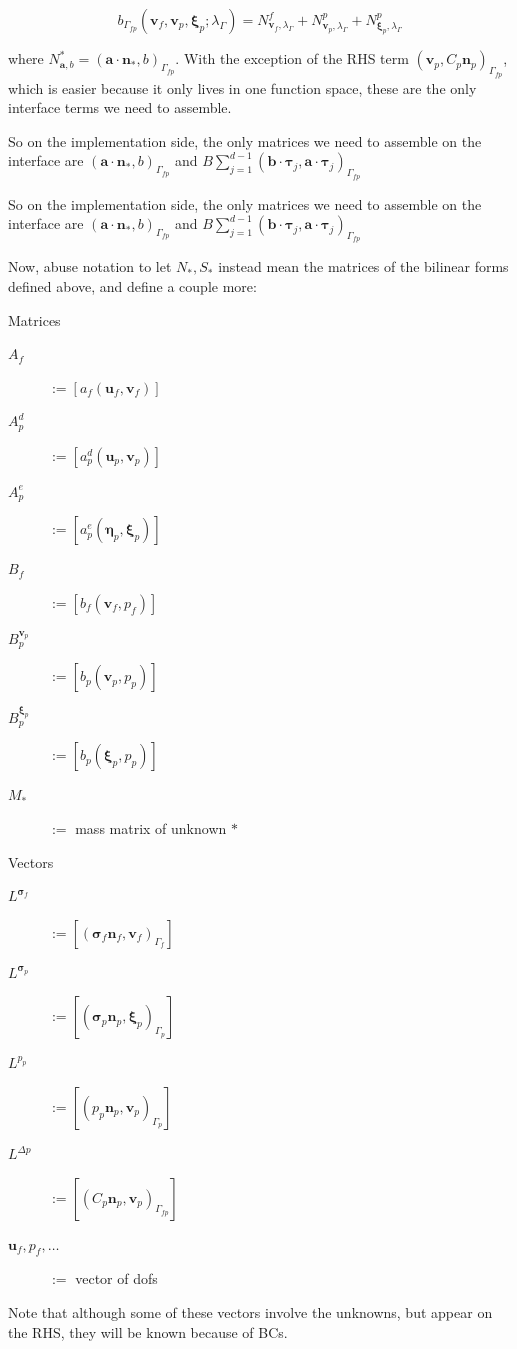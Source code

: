 \documentclass{article}
\newcommand{\mathspace}[1]{\ensuremath{#1}\xspace} %
\newcommand{\sigmabf}{\mathspace{\boldsymbol{\sigma}}}
\newcommand{\inner}[2]{\mathspace{\left (#1, #2 \right)}}
\newcommand{\defeq}{\mathspace{:=}}
\newcommand{\matrixform}[1]{\mathspace{\left [ #1 \right ]}}
\newcommand{\taubf}{\mathspace{\boldsymbol{\tau}}}
\newcommand{\stokesbdy}{\mathspace{\Gamma_{f}}}
\newcommand{\darcybdy}{\mathspace{\Gamma_{p}}}
\newcommand{\interface}{\mathspace{\Gamma_{fp}}}
\newcommand{\nf}{\mathspace{\mathbf{n}_f}}
\newcommand{\np}{\mathspace{\mathbf{n}_p}}
\newcommand{\nporf}{\mathspace{\mathbf{n}_*}}
\newcommand{\uf}{\mathspace{\mathbf{u}_f}}
\newcommand{\vf}{\mathspace{\mathbf{v}_f}}
\newcommand{\up}{\mathspace{\mathbf{u}_p}}
\newcommand{\vp}{\mathspace{\mathbf{v}_p}}
\newcommand{\pf}{\mathspace{p_f}}
\newcommand{\pp}{\mathspace{p_p}}
\newcommand{\disp}{\mathspace{\boldsymbol{\eta}_p}}
\newcommand{\disptest}{\mathspace{\boldsymbol{\xi}_p}}
\newcommand{\mult}{\mathspace{\lambda_{\Gamma}}}
\begin{document}
$$b_{\interface}(\vf, \vp, \disptest; \mult) = N^f_{\vf, \mult} + N^p_{\vp, \mult} + N^p_{\disptest, \mult} $$

where $N^*_{\mathbf{a}, b} = \inner{\mathbf{a} \cdot \nporf}{b}_{\interface}$. With the exception of the RHS term $\inner{\vp}{C_p\np}_{\interface}$, which is easier because it only lives in one function space, these are the only interface terms we need to assemble.

So on the implementation side, the only matrices we need to assemble on the interface are $\inner{\mathbf{a} \cdot \nporf}{b}_{\interface}$ and  $B \sum_{j=1}^{d-1} \inner{\mathbf{b} \cdot \taubf_j}{\mathbf{a} \cdot \taubf_j}_{\interface}$

So on the implementation side, the only matrices we need to assemble on the interface are $\inner{\mathbf{a} \cdot \nporf}{b}_{\interface}$ and  $B \sum_{j=1}^{d-1} \inner{\mathbf{b} \cdot \taubf_j}{\mathbf{a} \cdot \taubf_j}_{\interface}$

Now, abuse notation to let $N_*, S_*$ instead mean the matrices of the bilinear forms defined above, and define a couple more:
\begin{center}
  \begin{multicols}{2}
    Matrices
\begin{description}
\item[$A_f$] \defeq \matrixform{a_f(\uf, \vf)}
\item[$A^d_p$]\defeq  \matrixform{a_p^d(\up, \vp)}
\item[$A^e_p$]\defeq  \matrixform{a_p^e(\disp, \disptest)}
\item[$B_f$]\defeq  \matrixform{b_f(\vf, \pf)}
\item[$B^{\vp}_p$]\defeq  \matrixform{b_p(\vp, \pp)}
\item[$B^{\disptest}_p$]\defeq  \matrixform{b_p(\disptest, \pp)}
\item[$M_*$] \defeq mass matrix of unknown $* $
\end{description}
\columnbreak
Vectors
\begin{description}
\item[$L^{\sigmabf_f}$] \defeq \matrixform{\inner{\sigmabf_f \nf}{\vf}_{\stokesbdy}}
\item[$L^{\sigmabf_p}$] \defeq \matrixform{\inner{\sigmabf_p \np}{\disptest}_{\darcybdy}}
\item[$L^{\pp}$] \defeq \matrixform{\inner{\pp \np}{\vp}_{\darcybdy}}
\item[$L^{\Delta p}$] \defeq \matrixform{\inner{C_p\np}{\vp}_{\interface}}
\item[$\uf, \pf, \ldots$] \defeq vector of dofs
  
\end{description}

\end{multicols}
\end{center}
Note that although some of these vectors involve the unknowns, but appear on the RHS, they will be known because of BCs.
\end{document}
